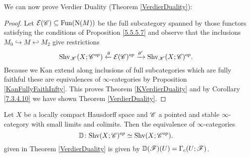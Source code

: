 \documentclass[../../thesis.tex]{subfiles}
\begin{document}
We can now prove Verdier Duality (Theorem \ref{VerdierDuality}):
\begin{proof}
    Let $\mathcal{E}(\mathscr{C}) \subseteq \mathrm{Fun}(\mathrm{N}(M))$ be the full subcategory spanned by those functors satisfying the conditions of Proposition \ref{5.5.5.7} and observe that the inclusions $M_0 \hookrightarrow M \hookleftarrow M_2$ give restrictions
    \[
        \mathrm{Shv}_{\mathscr{K}}(X;\mathscr{C}^{op}) \xleftarrow{\theta} \mathcal{E}(\mathscr{C})^{op} \xrightarrow{\theta'} \mathrm{Shv}_{\mathscr{K}}(X;\mathscr{C})^{op}.
    \]
    Because we Kan extend along inclusions of full subcategories which are fully faithful these are equivalences of $\infty$-categories by Proposition \ref{KanFullyFaithInfty}.
    This proves Theorem \ref{KVerdierDuality} and by Corollary \ref{7.3.4.10} we have shown Theorem \ref{VerdierDuality}.
\end{proof}
\begin{proposition}[{\cite[Proposition 5.5.5.10]{HA}}]
    Let $X$ be a locally compact Hausdorff space and $\mathscr{C}$ a pointed and stable $\infty$-category with small limits and colimits.
    Then the equivalence of $\infty$-categories
    \[
        \mathbb{D} \colon \mathrm{Shv}(X;\mathscr{C})^{op} \simeq \mathrm{Shv}(X;\mathscr{C}^{op}).
    \]
    given in Theorem \ref{VerdierDuality} is given by $\mathbb{D}(\mathscr{F})(U) = \Gamma_c(U;\mathscr{F})$.
\end{proposition}
\end{document}
